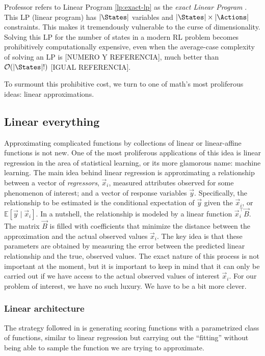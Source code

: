 Professor \citeauthor{farias2002thesis} refers to Linear Program
\eqref{lp:exact-lp} as the \textit{exact Linear Program}
\cite[Ch.~2.3]{farias2002thesis}. This LP (linear program) has $|\States|$
variables and $|\States| \times |\Actions|$ constraints. This makes it
tremendously vulnerable to the curse of dimensionality. Solving this LP for the
number of states in a modern RL problem becomes prohibitively computationally
expensive, even when the average-case complexity of solving an LP is [NUMERO Y
REFERENCIA], much better than $\mathcal{O}(|\States|!)$ [IGUAL REFERENCIA].

To surmount this prohibitive cost, we turn to one of math's most proliferous
ideas: linear approximations.

\subsection{Linear everything}

Approximating complicated functions by collections of linear or linear-affine
functions is not new. One of the most proliferous applications of this idea is
linear regression in the area of statistical learning, or its more glamorous
name: machine learning. The main idea behind linear regression is approximating
a relationship between a vector of \textit{regressors}, $\vec{x}_i$, measured
attributes observed for some phenomenon of interest; and a vector of response
variables $\vec{y}$. Specifically, the relationship to be estimated is the
conditional expectation of $\vec{y}$ given the $\vec{x}_i$, or $\mathbb{E} \left[ \vec{y}
\mid \vec{x}_i \right]$. In a nutshell, the relationship is modeled by a linear
function $\vec{x}_{i}^{\top} \vec{B}$. The matrix $\vec{B}$ is filled with
coefficients that minimize the distance between the approximation and the actual
observed values $\vec{x}_i$. The key idea is that these parameters are obtained
by measuring the error between the predicted linear relationship and the true,
observed values. The exact nature of this process is not important at the
moment, but it is important to keep in mind that it can only be carried out if
we have access to the actual observed values of interest $\vec{x}_i$. For our
problem of interest, we have no such luxury. We have to be a bit more clever.

\subsubsection{Linear architecture}
The strategy followed in \cite{farias2002thesis} is generating scoring functions
with a pa\-ra\-me\-trized class of functions, similar to linear regression but
carrying out the ``fitting'' without being able to sample the function we are
trying to approximate.

